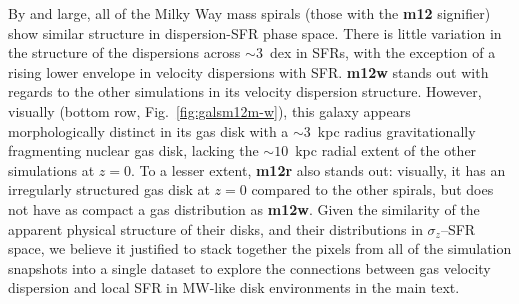 \documentclass[usletter,fleqn,usenatbib]{mnras}
\begin{document}
By and large, all of the Milky Way mass spirals (those with the \textbf{m12} signifier) show similar structure in dispersion-SFR phase space.  There is little variation in the structure of the dispersions across $\sim3$~dex in SFRs, with the exception of a rising lower envelope in velocity dispersions with SFR.  \textbf{m12w} stands out with regards to the other simulations in its velocity dispersion structure.  However, visually (bottom row, Fig.~\ref{fig:galsm12m-w}), this galaxy appears morphologically distinct in its gas disk with a $\sim 3$~kpc radius gravitationally fragmenting nuclear gas disk, lacking the $\sim 10$~kpc radial extent of the other simulations at $z=0$.  To a lesser extent, \textbf{m12r} also stands out: visually, it has an irregularly structured gas disk at $z=0$ compared to the other spirals, but does not have as compact a gas distribution as \textbf{m12w}.  Given the similarity of the apparent physical structure of their disks, and their distributions in $\sigma_z$--SFR space, we believe it justified to stack together the pixels from all of the simulation snapshots into a single dataset to explore the connections between gas velocity dispersion and local SFR in MW-like disk environments in the main text.




\label{lastpage}
\end{document}
